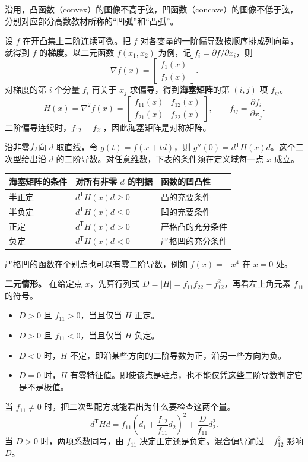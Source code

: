 \begin{tcolorbox}[knowledge,title=海塞矩阵与凹凸性的二阶判别]
沿用，凸函数（convex）的图像不高于弦，凹函数（concave）的图像不低于弦，分别对应部分高数教材所称的“凹弧”和“凸弧”。

设 $f$ 在开凸集上二阶连续可微。把 $f$ 对各变量的一阶偏导数按顺序排成列向量，就得到 $f$ 的\textbf{梯度}。以二元函数 $f(x_1,x_2)$ 为例，记 $f_i=\partial f/\partial x_i$，则
\[
 \nabla f(x)=\begin{bmatrix}f_1(x)\\f_2(x)\end{bmatrix}.
\]
对梯度的第 $i$ 个分量 $f_i$ 再关于 $x_j$ 求偏导，得到\textbf{海塞矩阵}的第 $(i,j)$ 项 $f_{ij}$。
\[
 H(x)=\nabla^2 f(x)=
 \begin{bmatrix}
  f_{11}(x)&f_{12}(x)\\
  f_{21}(x)&f_{22}(x)
 \end{bmatrix},
 \qquad f_{ij}=\frac{\partial f_i}{\partial x_j}.
\]
二阶偏导连续时，$f_{12}=f_{21}$，因此海塞矩阵是对称矩阵。

沿非零方向 $d$ 取直线，令 $g(t)=f(x+td)$，则 $g''(0)=d^{\mathsf T}H(x)d$。这个二次型给出沿 $d$ 的二阶导数。对任意维数，下表的条件须在定义域每一点 $x$ 成立。
\begin{center}
\begin{tabular}{@{}lll@{}}
\toprule
海塞矩阵的条件 & 对所有非零 $d$ 的判据 & 函数的凹凸性 \\
\midrule
半正定 & $d^{\mathsf T}H(x)d\geq 0$ & 凸的充要条件 \\
半负定 & $d^{\mathsf T}H(x)d\leq 0$ & 凹的充要条件 \\
正定   & $d^{\mathsf T}H(x)d>0$     & 严格凸的充分条件 \\
负定   & $d^{\mathsf T}H(x)d<0$     & 严格凹的充分条件 \\
\bottomrule
\end{tabular}
\end{center}
严格凹的函数在个别点也可以有零二阶导数，例如 $f(x)=-x^4$ 在 $x=0$ 处。

\textbf{二元情形。} 在给定点 $x$，先算行列式 $D=\lvert H\rvert=f_{11}f_{22}-f_{12}^2$，再看左上角元素 $f_{11}$ 的符号。
\begin{itemize}
 \item $D>0$ 且 $f_{11}>0$，当且仅当 $H$ 正定。
 \item $D>0$ 且 $f_{11}<0$，当且仅当 $H$ 负定。
 \item $D<0$ 时，$H$ 不定，即沿某些方向的二阶导数为正，沿另一些方向为负。
 \item $D=0$ 时，$H$ 有零特征值。即使该点是驻点，也不能仅凭这些二阶导数判定它是不是极值。
\end{itemize}
当 $f_{11}\ne0$ 时，把二次型配方就能看出为什么要检查这两个量。
\[
 d^{\mathsf T}Hd
 =f_{11}\left(d_1+\frac{f_{12}}{f_{11}}d_2\right)^2
   +\frac{D}{f_{11}}d_2^2.
\]
当 $D>0$ 时，两项系数同号，由 $f_{11}$ 决定正定还是负定。混合偏导通过 $-f_{12}^2$ 影响 $D$。


\end{tcolorbox}

